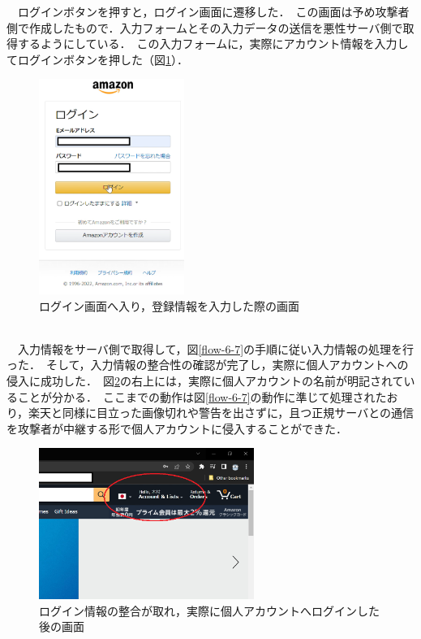 \documentclass[dvipdfmx]{jsarticle}
\begin{document}
                    \clearpage
                    　ログインボタンを押すと，ログイン画面に遷移した．\
                    この画面は予め攻撃者側で作成したもので．入力フォームとその入力データの送信を悪性サーバ側で取得するようにしている．\
                    この入力フォームに，実際にアカウント情報を入力してログインボタンを押した（図\ref{amazon-02}）．\
                    \begin{figure}[pth]
                        \centering
                        \includegraphics[height=7cm]{img/amazon/amazon-02.png}
                        \caption{ログイン画面へ入り，登録情報を入力した際の画面}
                        \label{amazon-02}
                    \end{figure}
                    \\
                    　入力情報をサーバ側で取得して，図\ref{flow-6-7}の手順に従い入力情報の処理を行った．\
                    そして，入力情報の整合性の確認が完了し，実際に個人アカウントへの侵入に成功した．\
                    図\ref{amazon-03}の右上には，実際に個人アカウントの名前が明記されていることが分かる．\
                    ここまでの動作は図\ref{flow-6-7}の動作に準じて処理されたおり，楽天と同様に目立った画像切れや警告を出さずに，且つ正規サーバとの通信を攻撃者が中継する形で個人アカウントに侵入することができた．\
                    \begin{figure}[pth]
                        \centering
                        \includegraphics[width=7cm]{img/amazon/amazon-03.png}
                        \caption{ログイン情報の整合が取れ，実際に個人アカウントへログインした後の画面}
                        \label{amazon-03}
                    \end{figure}
                    \clearpage
\end{document}
